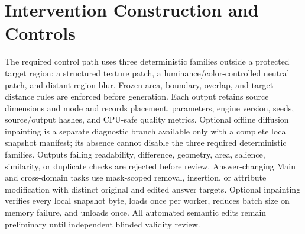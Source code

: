 \section{Intervention Construction and Controls}
The required control path uses three deterministic families outside a protected target region: a
structured texture patch, a luminance/color-controlled neutral patch, and distant-region blur. Frozen
area, boundary, overlap, and target-distance rules are enforced before generation. Each output retains
source dimensions and mode and records placement, parameters, engine version, seeds, source/output
hashes, and CPU-safe quality metrics. Optional offline diffusion inpainting is a separate diagnostic
branch available only with a complete local snapshot manifest; its absence cannot disable the three
required deterministic families. Outputs failing readability, difference, geometry, area, salience,
similarity, or duplicate checks are rejected before review. Answer-changing Main and cross-domain
tasks use mask-scoped removal, insertion, or attribute modification with distinct original and edited
answer targets. Optional inpainting verifies every local snapshot byte, loads once per worker, reduces
batch size on memory failure, and unloads once. All automated semantic edits remain preliminary until
independent blinded validity review.
